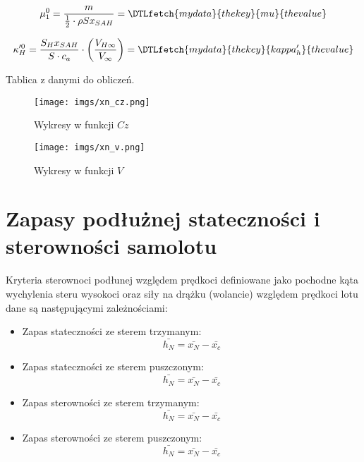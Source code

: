 \documentclass{sprawozdanie}
\newcommand{\PlaneVar}[1]{\DTLfetch{mydata}{thekey}{#1}{thevalue}}
\begin{document}
\begin{equation}
    \mu_1^0 = \frac{m}{\frac{1}{2}\cdot\rho S x_{SAH}} = \PlaneVar{mu}
    \label{eq:muzeroone}
\end{equation}


\begin{equation}
    \kappa'^0_H = \frac{S_H x_{SAH}}{S \cdot c_a}\cdot\left(\frac{V_{H\infty}}{V_\infty}\right) = \PlaneVar{kappa'_h}
    \label{eq:kappazerH}
\end{equation}

\begin{table}[H]
    \let\center\empty
    \centering
    \resizebox{0.99\width}{!}{}
    \caption{Tablica z danymi do obliczeń.}
    \label{tab:tab1}
\end{table}



\begin{figure}[H]
    \centering
    \texttt{[image: imgs/xn\_cz.png]}
    \caption{Wykresy w funkcji $Cz$}
    \label{fig:xn_cz}
\end{figure}

\begin{figure}[H]
    \centering
    \texttt{[image: imgs/xn\_v.png]}
    \caption{Wykresy w funkcji $V$}
    \label{fig:xn_cz2}
\end{figure}

\section{Zapasy podłużnej stateczności i sterowności samolotu}

Kryteria sterownoci podłunej względem prędkoci definiowane jako pochodne kąta
wychylenia steru wysokoci oraz siły na drążku (wolancie) względem prędkoci lotu dane są następującymi zależnościami:

\begin{itemize}
    \item Zapas stateczności ze sterem trzymanym:
    \begin{equation*}
        \bar{h_N} = \bar{x_N}-\bar{x_c} 
    \end{equation*}
    \item Zapas stateczności ze sterem puszczonym:
    \begin{equation*}
        \bar{h_N} = \bar{x_N}-\bar{x_c} 
    \end{equation*}
    \item Zapas sterowności ze sterem trzymanym:
    \begin{equation*}
        \bar{h_N} = \bar{x_N}-\bar{x_c} 
    \end{equation*}
    \item Zapas sterowności ze sterem puszczonym:
    \begin{equation*}
        \bar{h_N} = \bar{x_N}-\bar{x_c} 
    \end{equation*}
\end{itemize}
\end{document}
